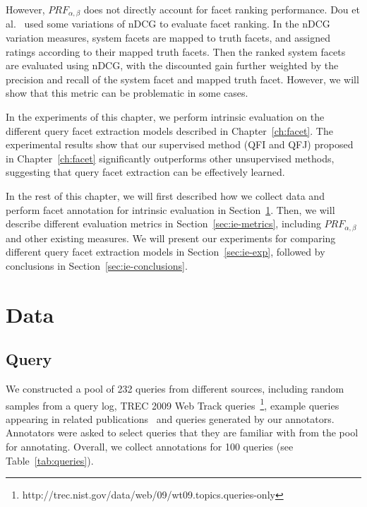 However, $PRF_{\alpha,\beta}$ does not directly account for facet ranking performance. Dou et al.~\cite{dou2011finding} used some variations of nDCG to evaluate facet ranking. In the nDCG variation measures, system facets are mapped to truth facets, and assigned ratings according to their mapped truth facets. Then the ranked system facets are evaluated using nDCG, with the discounted gain further weighted by the precision and recall of the system facet and mapped truth facet. However, we will show that this metric can be problematic in some cases.

In the experiments of this chapter, we perform intrinsic evaluation on the different query facet extraction models described in Chapter~\ref{ch:facet}. The experimental results show that our supervised method (QFI and QFJ) proposed in Chapter~\ref{ch:facet} significantly outperforms other unsupervised methods, suggesting that query facet extraction can be effectively learned.

In the rest of this chapter, we will first described how we collect data and perform facet annotation for intrinsic evaluation in Section~\ref{sec:ie-data}. Then, we will describe different evaluation metrics in Section~\ref{sec:ie-metrics}, including $PRF_{\alpha,\beta}$ and other existing measures. We will present our experiments for comparing different query facet extraction models in Section~\ref{sec:ie-exp}, followed by conclusions in Section~\ref{sec:ie-conclusions}. 


\section{Data} \label{sec:ie-data}
\subsection{Query}
We constructed a pool of 232 queries from different sources, including random samples from a query log, TREC 2009 Web Track queries~\footnote{http://trec.nist.gov/data/web/09/wt09.topics.queries-only}, example queries appearing in related publications~\cite{xue2011topic,wang2009mining} and queries generated by our annotators.
Annotators were asked to select queries that they are familiar with from the pool for annotating.
Overall, we collect annotations for 100 queries (see Table~\ref{tab:queries}).

